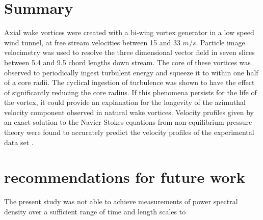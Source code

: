 
\section{Summary}

Axial wake vortices were created with a bi-wing vortex generator in a low speed 
wind tunnel, at free stream velocities between 15 and 33 $m/s$. Particle image 
velocimetry was used to resolve the three dimensional vector field in seven 
slices between 5.4 and 9.5 chord lengths down stream. The core of these 
vortices was observed to periodically ingest turbulent energy and squeeze it to 
within one half of a core radii. The cyclical ingestion of turbulence was shown 
to have the effect of significantly reducing the core radius. If this phenomena 
persists for the life of the vortex, it could provide an explanation for the 
longevity of the azimuthal velocity component observed in natural wake vortices.
Velocity profiles given by an exact solution to the Navier Stokes equations 
from non-equilibrium pressure theory were found to accurately predict 
the velocity profiles of the experimental data set \cite{ash2011}.

\section{recommendations for future work}
The present study was not able to achieve measurements of power spectral 
density over a sufficient range of time and length scales to 
